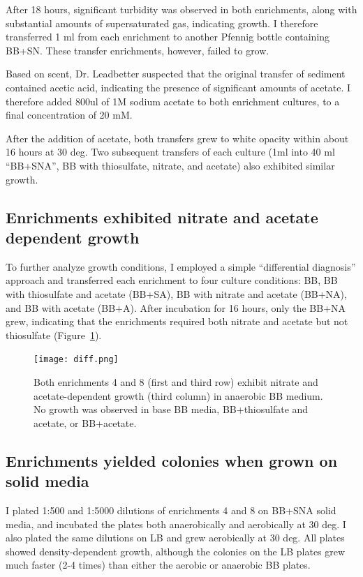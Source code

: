 \documentclass{article}
\begin{document}
After 18 hours, significant turbidity was observed in both
enrichments, along with substantial amounts of supersaturated gas,
indicating growth.  I therefore transferred 1 ml from each enrichment
to another Pfennig bottle containing BB+SN.  These transfer
enrichments, however, failed to grow.

Based on scent, Dr. Leadbetter suspected that the original transfer of
sediment contained acetic acid, indicating the presence of significant
amounts of acetate.  I therefore added 800ul of 1M sodium acetate to
both enrichment cultures, to a final concentration of 20 mM.

After the addition of acetate, both transfers grew to white opacity
within about 16 hours at 30 deg.  Two subsequent transfers of each
culture (1ml into 40 ml ``BB+SNA'', BB with thiosulfate, nitrate, and
acetate) also exhibited similar growth.

\subsection*{Enrichments exhibited nitrate and acetate dependent growth}

To further analyze growth conditions, I employed a simple
``differential diagnosis'' approach and transferred each enrichment to
four culture conditions: BB, BB with thiosulfate and acetate (BB+SA),
BB with nitrate and acetate (BB+NA), and BB with acetate (BB+A).
After incubation for 16 hours, only the BB+NA grew, indicating that
the enrichments required both nitrate and acetate but not
thiosulfate (Figure~\ref{fig:diff}).

\begin{figure}[!ht]
  \centerline{\texttt{[image: diff.png]}}
  \caption{Both enrichments 4 and 8 (first and third row) exhibit
    nitrate and acetate-dependent growth (third column) in anaerobic BB medium. No growth was observed in base BB media, BB+thiosulfate and acetate, or BB+acetate.}
  \label{fig:diff}
\end{figure}


\subsection*{Enrichments yielded colonies when grown on solid media}

I plated 1:500 and 1:5000 dilutions of enrichments 4 and 8 on BB+SNA
solid media, and incubated the plates both anaerobically and
aerobically at 30 deg.  I also plated the same dilutions on LB and
grew aerobically at 30 deg.  All plates showed density-dependent growth,
although the colonies on the LB plates grew much faster (2-4 times)
than either the aerobic or anaerobic BB plates.
\end{document}
